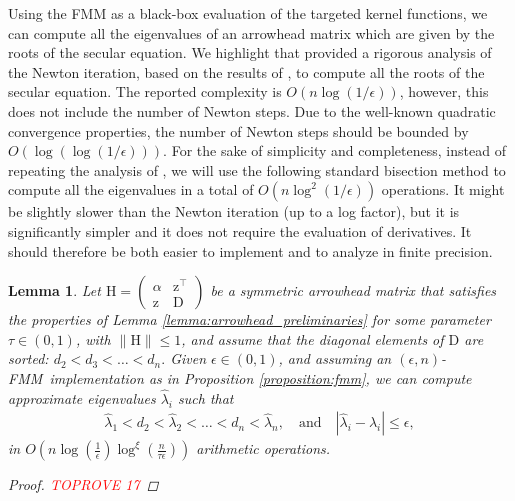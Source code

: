 \documentclass{article}
\newcommand{\lpar}{\left(}
\newcommand{\rpar}{\right)}
\newtheorem{lemma}{Lemma}[section]
\newcommand\vecz{\boldsymbol{\mathrm{z}}}
\newcommand\matD{\boldsymbol{\mathrm{D}}}
\newcommand\matH{\boldsymbol{\mathrm{H}}}
\newcommand{\cfmm}{\xi}
\newcommand{\fmmalgo}{FMM} \usepackage[utf8]{inputenc}
\begin{document}
Using the FMM as a black-box evaluation of the targeted kernel functions, we can compute all the eigenvalues of an arrowhead matrix which are given by the roots of the secular equation.
We highlight that \cite{livne2002n} provided a rigorous analysis of the Newton iteration, based on the results of \cite{melman1995numerical}, to compute all the roots of the secular equation. The reported complexity is $O(n\log(1/\epsilon))$, however, this does not include the number of Newton steps. Due to the well-known quadratic convergence properties, the number of Newton steps should be bounded by $O(\log(\log(1/\epsilon)))$. For the sake of simplicity and completeness, instead of repeating the analysis of \cite{livne2002n}, we will use the following standard bisection method to compute all the eigenvalues in a total of $O(n\log^2(1/\epsilon))$ operations. It might be slightly slower than the Newton iteration (up to a log factor), but it is significantly simpler and it does not require the evaluation of derivatives. It should therefore be both easier to implement and to analyze in finite precision. 

\begin{lemma}
    \label{lemma:fmm_approximate_eigenvalues}
    Let $\matH=\begin{pmatrix}
        \alpha & \vecz^\top\\
        \vecz & \matD
    \end{pmatrix}
    $
    be a symmetric arrowhead matrix 
    that satisfies the properties of Lemma \ref{lemma:arrowhead_preliminaries} for some parameter $\tau\in(0,1)$,
    with $\|\matH\|\leq 1$, 
    and assume that the diagonal elements of $\matD$ are sorted:
    $
        d_2 < d_3 <\ldots < d_n.
    $ 
    Given $\epsilon\in(0,1)$, and assuming an $(\epsilon,n)$-\fmmalgo\   implementation as in Proposition \ref{proposition:fmm}, we can compute approximate eigenvalues $\widehat\lambda_i$ such that
    \begin{align*}
        \widehat\lambda_1< d_2 < \widehat\lambda_2 < \ldots <d_n < \widehat\lambda_n, 
        \quad \text{and} \quad
        |\widehat\lambda_i -\lambda_i| \leq \epsilon,
    \end{align*}
    in $O\lpar
        n\log(\tfrac{1}{\epsilon})\log^{\cfmm}(\frac{n}{\tau\epsilon})
    \rpar$ arithmetic operations.
    \begin{proof}\textcolor{red}{TOPROVE 17}\end{proof}
\end{lemma}
\end{document}
